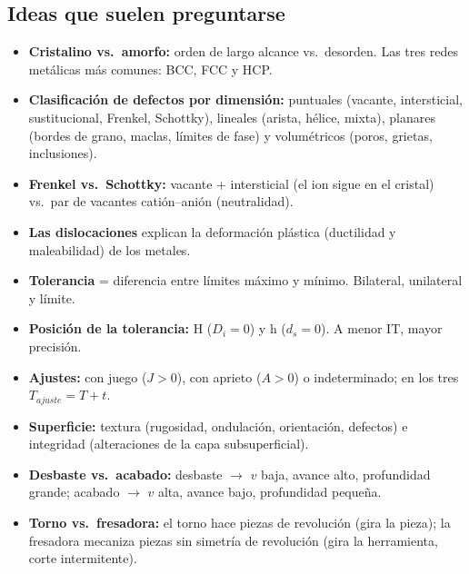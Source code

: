 \documentclass[12pt,a4paper]{article}
\begin{document}
\subsection{Ideas que suelen preguntarse}
\begin{itemize}
	\item \textbf{Cristalino vs.\ amorfo:} orden de largo alcance vs.\ desorden.
	      Las tres redes metálicas más comunes: BCC, FCC y HCP.
	\item \textbf{Clasificación de defectos por dimensión:} puntuales (vacante,
	      intersticial, sustitucional, Frenkel, Schottky), lineales (arista,
	      hélice,
	      mixta), planares (bordes de grano, maclas, límites de fase) y
	      volumétricos
	      (poros, grietas, inclusiones).
	\item \textbf{Frenkel vs.\ Schottky:} vacante + intersticial (el ion sigue en
	      el cristal) vs.\ par de vacantes catión--anión (neutralidad).
	\item \textbf{Las dislocaciones} explican la deformación plástica (ductilidad
	      y maleabilidad) de los metales.
	\item \textbf{Tolerancia} = diferencia entre límites máximo y mínimo.
	      Bilateral, unilateral y límite.
	\item \textbf{Posición de la tolerancia:} H ($D_i = 0$) y h ($d_s = 0$). A
	      menor IT, mayor precisión.
	\item \textbf{Ajustes:} con juego ($J>0$), con aprieto ($A>0$) o
	      indeterminado; en los tres $T_{ajuste} = T + t$.
	\item \textbf{Superficie:} textura (rugosidad, ondulación, orientación,
	      defectos) e integridad (alteraciones de la capa subsuperficial).
	\item \textbf{Desbaste vs.\ acabado:} desbaste $\to$ $v$ baja, avance alto,
	      profundidad grande; acabado $\to$ $v$ alta, avance bajo, profundidad
	      pequeña.
	\item \textbf{Torno vs.\ fresadora:} el torno hace piezas de revolución (gira
	      la pieza); la fresadora mecaniza piezas sin simetría de revolución (gira
	      la herramienta, corte intermitente).
\end{itemize}
\end{document}
